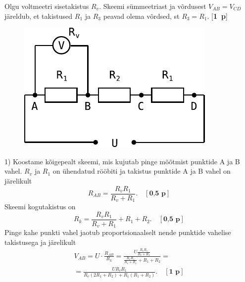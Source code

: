\documentclass[11pt,a5paper]{article}
\newcommand{\p}[1]{[\textbf{#1~p}]}
\begin{document}
Olgu voltmeetri sisetakistus $R_v$. Skeemi sümmeetriast ja võrdusest $V_{AB}=V_{CD}$ järeldub, et takistused $R_1$ ja $R_3$ peavad olema võrdsed, st $R_3=R_1$. \p{1}

\begin{figure}
\vspace{-1em}
  \begin{center}
    \includegraphics[width=1\linewidth]{ahelad_efo2.pdf}
  \end{center}
\end{figure}

1) Koostame kõigepealt skeemi, mis kujutab pinge mõõtmist punktide A ja B vahel. $R_v$ ja $R_1$ on ühendatud rööbiti ja takistus punktide A ja B vahel on järelikult
\[
R_{AB}=\frac{R_v R_1}{R_v + R_1}. \quad \p{0,5}
\]
Skeemi kogutakistus on
\[
R_{k}=\frac{R_v R_1}{R_v + R_1} + R_1+R_2. \quad \p{0,5}
\]
Pinge kahe punkti vahel jaotub proportsionaalselt nende punktide vahelise takistusega ja järelikult
\begin{multline*}
V_{AB}=U\cdot\frac{R_{AB}}{R_k}=\frac{U\frac{R_v R_1}{R_v + R_1}}{\frac{R_v R_1}{R_v + R_1} + R_1+R_2}=\\
=\frac{UR_vR_1}{R_v(2R_1+R_2)+R_1(R_1+R_2)}. \quad \p{1}
\end{multline*}
\end{document}
